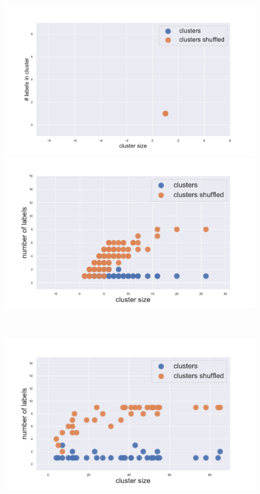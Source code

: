 \begin{figure}[htb!]
    \centering
    \begin{minipage}{0.45\textwidth}
    \includegraphics[width=0.9\linewidth]{pictures/topic/gtex/oversigma_10tissue/shuffledcluster_shuffle_label_size_l0_primary_site.pdf}
    \end{minipage}
    \hspace{3mm}
    \begin{minipage}{0.45\textwidth}
    \includegraphics[width=0.9\linewidth]{pictures/topic/gtex/oversigma_10tissue/shuffledcluster_shuffle_label_size_l1_primary_site.pdf}
    \end{minipage}
    \\
    \begin{minipage}{0.45\textwidth}
    \includegraphics[width=0.9\linewidth]{pictures/topic/gtex/oversigma_10tissue/shuffledcluster_shuffle_label_size_l2_primary_site.pdf}

\end{minipage}
\end{figure}
